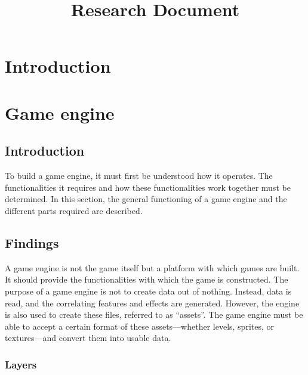 \documentclass{projdoc}
\title{Research Document}
\begin{document}
\tablestables
\newpage

\section{Introduction}

\section{Game engine}

\subsection{Introduction}

To build a game engine, it must first be understood how it operates. The
functionalities it requires and how these functionalities work together must be
determined. In this section, the general functioning of a game engine and the
different parts required are described.

\subsection{Findings}

A game engine is not the game itself but a platform with which games are built. It
should provide the functionalities with which the game is constructed. The purpose of
a game engine is not to create data out of nothing. Instead, data is read, and the
correlating features and effects are generated. However, the engine is also used to
create these files, referred to as ``assets''. The game engine must be able to accept
a certain format of these assets---whether levels, sprites, or textures---and convert
them into usable data.

\subsubsection{Layers}
\end{document}
